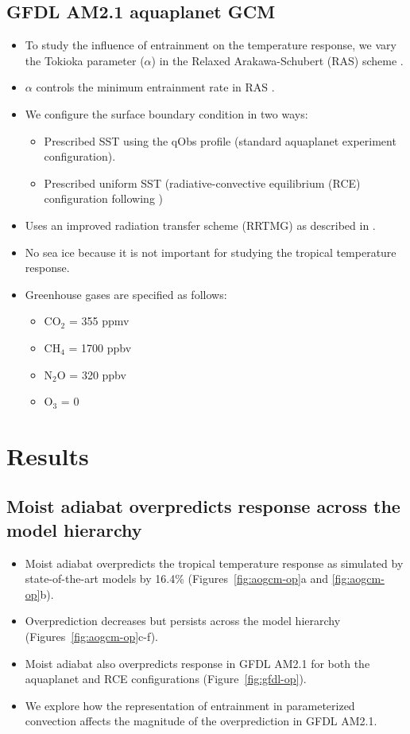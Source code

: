 \documentclass[draft]{agujournal2019}
\begin{document}
\begin{itemize}
\subsection{GFDL AM2.1 aquaplanet GCM}
\begin{itemize}
\item To study the influence of entrainment on the temperature response, we vary the Tokioka parameter ($\alpha$) in the Relaxed Arakawa-Schubert (RAS) scheme \cite{moorthi-suarez-1992}. 
\item $\alpha$ controls the minimum entrainment rate in RAS \cite{tokioka-et-al-1988}.
\item We configure the surface boundary condition in two ways:
\begin{itemize}
\item Prescribed SST using the qObs profile (standard aquaplanet experiment configuration).
\item Prescribed uniform SST (radiative-convective equilibrium (RCE) configuration following )
\end{itemize}
\item Uses an improved radiation transfer scheme (RRTMG) as described in .
\item No sea ice because it is not important for studying the tropical temperature response.
\item Greenhouse gases are specified as follows:
\begin{itemize}
\item CO$_2$ = 355 ppmv
\item CH$_4$ = 1700 ppbv
\item N$_2$O = 320 ppbv
\item O$_3$ = 0
\end{itemize} 
\end{itemize}

\end{itemize}

\section{Results}

\subsection{Moist adiabat overpredicts response across the model hierarchy}

\begin{itemize}
\item Moist adiabat overpredicts the tropical temperature response as simulated by state-of-the-art models by 16.4\% (Figures~\ref{fig:aogcm-op}a and \ref{fig:aogcm-op}b).
\item Overprediction decreases but persists across the model hierarchy (Figures~\ref{fig:aogcm-op}c-f).
\item Moist adiabat also overpredicts response in GFDL AM2.1 for both the aquaplanet and RCE configurations (Figure~\ref{fig:gfdl-op}).
\item We explore how the representation of entrainment in parameterized convection affects the magnitude of the overprediction in GFDL AM2.1.
\end{itemize}
\end{document}
